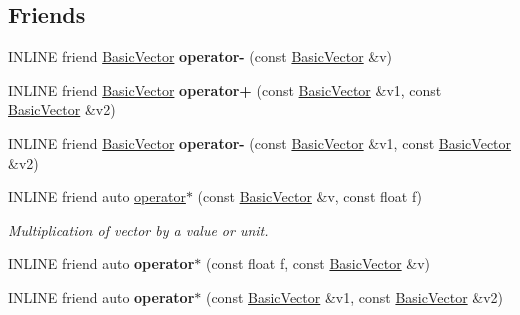 \subsection*{Friends}
\begin{DoxyCompactItemize}
\item 
\hypertarget{classBasicVector_3_01float_01_4_a1f307378bb3c5832f697c8932d79848c}{}\label{classBasicVector_3_01float_01_4_a1f307378bb3c5832f697c8932d79848c} 
I\+N\+L\+I\+NE friend \hyperlink{classBasicVector}{Basic\+Vector} {\bfseries operator-\/} (const \hyperlink{classBasicVector}{Basic\+Vector} \&v)
\item 
\hypertarget{classBasicVector_3_01float_01_4_a52a8854619f1dbb9760107773b8631fe}{}\label{classBasicVector_3_01float_01_4_a52a8854619f1dbb9760107773b8631fe} 
I\+N\+L\+I\+NE friend \hyperlink{classBasicVector}{Basic\+Vector} {\bfseries operator+} (const \hyperlink{classBasicVector}{Basic\+Vector} \&v1, const \hyperlink{classBasicVector}{Basic\+Vector} \&v2)
\item 
\hypertarget{classBasicVector_3_01float_01_4_a752028cbae3f96cf020d4e9673faaecd}{}\label{classBasicVector_3_01float_01_4_a752028cbae3f96cf020d4e9673faaecd} 
I\+N\+L\+I\+NE friend \hyperlink{classBasicVector}{Basic\+Vector} {\bfseries operator-\/} (const \hyperlink{classBasicVector}{Basic\+Vector} \&v1, const \hyperlink{classBasicVector}{Basic\+Vector} \&v2)
\item 
\hypertarget{classBasicVector_3_01float_01_4_a0a30a111c264cc115c7d6fa2ba1d7650}{}\label{classBasicVector_3_01float_01_4_a0a30a111c264cc115c7d6fa2ba1d7650} 
I\+N\+L\+I\+NE friend auto \hyperlink{classBasicVector_3_01float_01_4_a0a30a111c264cc115c7d6fa2ba1d7650}{operator$\ast$} (const \hyperlink{classBasicVector}{Basic\+Vector} \&v, const float f)
\begin{DoxyCompactList}\small\item\em Multiplication of vector by a value or unit. \end{DoxyCompactList}\item 
\hypertarget{classBasicVector_3_01float_01_4_a2f6192488cd5b16eafc78ca0d05d9e10}{}\label{classBasicVector_3_01float_01_4_a2f6192488cd5b16eafc78ca0d05d9e10} 
I\+N\+L\+I\+NE friend auto {\bfseries operator$\ast$} (const float f, const \hyperlink{classBasicVector}{Basic\+Vector} \&v)
\item 
\hypertarget{classBasicVector_3_01float_01_4_afec38b18caebad20ce14e3d89ac6a272}{}\label{classBasicVector_3_01float_01_4_afec38b18caebad20ce14e3d89ac6a272} 
I\+N\+L\+I\+NE friend auto {\bfseries operator$\ast$} (const \hyperlink{classBasicVector}{Basic\+Vector} \&v1, const \hyperlink{classBasicVector}{Basic\+Vector} \&v2)

\end{DoxyCompactItemize}
